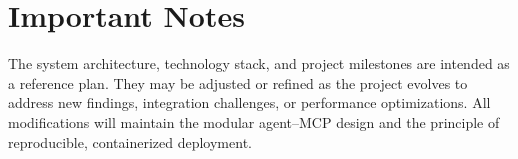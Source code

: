 \documentclass[11pt,a4paper]{article}
\begin{document}
\section{Important Notes}

The system architecture, technology stack, and project milestones are intended as a reference plan.  
They may be adjusted or refined as the project evolves to address new findings, integration challenges, or performance optimizations.  
All modifications will maintain the modular agent–MCP design and the principle of reproducible, containerized deployment.
\end{document}
